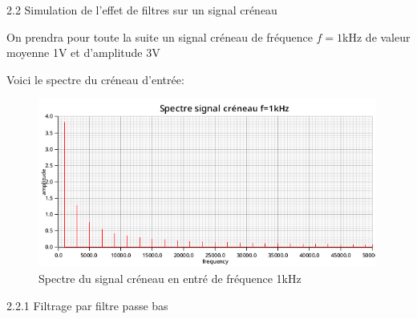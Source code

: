 \documentclass{article}
\newcommand{\expart}[1]
{
    \begin{largeUnderline}#1\end{largeUnderline}\par
}
\begin{document}
\expart{2.2 Simulation de l'effet de filtres sur un signal créneau}

On prendra pour toute la suite un signal créneau de fréquence $f=1$kHz de valeur moyenne 1V et d'amplitude 3V

Voici le spectre du créneau d'entrée:

\begin{figure}[H]
  \centering
  \includegraphics[height=15em]{images/creneau/fft_in.png}
  \caption{Spectre du signal créneau en entré de fréquence 1kHz}
\end{figure}

\expart{2.2.1 Filtrage par filtre passe bas}
\end{document}
